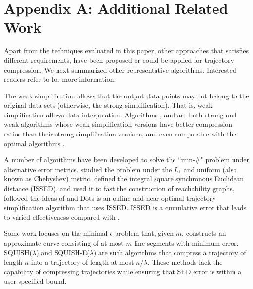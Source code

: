 \vspace{-1ex}
\section*{Appendix A: Additional Related Work}
Apart from the techniques evaluated in this paper, other approaches that satisfies different requirements, have been proposed or could be applied for trajectory compression.
We next summarized other representative \lsa algorithms. Interested readers refer to \cite{Shi:Survey, Muckell:Compression, Lin:Cised, Zhang:Evaluation} for more information. %


The weak simplification allows that the output data points may not belong to the original data sets \cite{Trajcevski:DDR} (otherwise, the strong simplification). 
That is, weak simplification allows data interpolation. Algorithms \sleeve \cite{Zhao:Sleeve}, \operb\cite{Lin:Operb} and \cised \cite{Lin:Cised} are both strong and weak \lsa algorithms whose weak simplification versions have better compression ratios than their strong simplification versions, and even comparable with the optimal algorithms \cite{Lin:Cised}.

A number of algorithms \cite{Agarwal:Metric, Chen:Fast, Wu:Graph,Cao:Dots} have been developed to solve the ``min-\#" problem under alternative error metrics.
\cite{Agarwal:Metric} studied the problem under the $L_1$ and uniform (also known as Chebyshev) metric. %
\cite{Chen:Fast} defined  the integral square synchronous Euclidean distance (ISSED), and used it to fast the construction of reachability graphs, \cite{Wu:Graph} followed the ideas of \cite{Chen:Fast} and Dots\cite{Cao:Dots} is an online and near-optimal trajectory simplification algorithm that uses ISSED.
ISSED is a cumulative error that leads to varied effectiveness compared with \sed.



Some work focuses on the minimal $\epsilon$ problem \cite{Chan:Optimal} that, given $m$, constructs an approximate curve consisting of at most $m$ line segments with minimum error. SQUISH($\lambda$) \cite{Muckell:SQUISH} and SQUISH-E($\lambda$) \cite{Muckell:Compression} are such algorithms that compress a trajectory of length $n$ into a trajectory of length at most $n/\lambda$. 
These methods lack the capability of compressing trajectories while ensuring that SED error is within a user-specified bound\cite{Muckell:Compression}.


